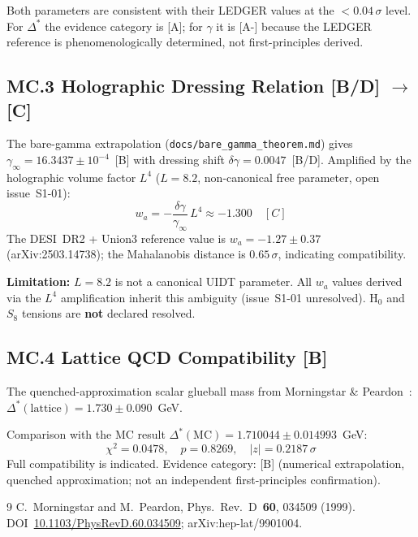 Both parameters are consistent with their LEDGER values at the $<0.04\,\sigma$
level.
For $\Delta^*$ the evidence category is [A];
for $\gamma$ it is [A-] because the LEDGER reference is phenomenologically
determined, not first-principles derived.

\subsection*{MC.3 Holographic Dressing Relation
  \textnormal{\textmd{[B/D] $\to$ [C]}}}

The bare-gamma extrapolation (\verb|docs/bare_gamma_theorem.md|) gives
$\gamma_\infty = 16.3437\pm10^{-4}$~[B] with dressing shift
$\delta\gamma = 0.0047$~[B/D].
Amplified by the holographic volume factor $L^4$ ($L=8.2$, non-canonical
free parameter, open issue~S1-01):
\[
  w_a = -\frac{\delta\gamma}{\gamma_\infty}\,L^4
        \approx -1.300 \quad [C]
\]
The DESI~DR2 + Union3 reference value is
$w_a = -1.27\pm0.37$ (arXiv:2503.14738);
the Mahalanobis distance is $0.65\,\sigma$, indicating compatibility.

\textbf{Limitation:} $L=8.2$ is not a canonical UIDT parameter.
All $w_a$ values derived via the $L^4$ amplification inherit this ambiguity
(issue~S1-01 unresolved).
H$_0$ and $S_8$ tensions are \textbf{not} declared resolved.

\subsection*{MC.4 Lattice QCD Compatibility \textnormal{\textmd{[B]}}}

The quenched-approximation scalar glueball mass from
Morningstar \& Peardon~\cite{Morningstar1999}:
$\Delta^*(\text{lattice}) = 1.730\pm0.090$~GeV.

Comparison with the MC result $\Delta^*(\text{MC}) = 1.710044\pm0.014993$~GeV:
\[
  \chi^2 = 0.0478, \quad p = 0.8269, \quad |z| = 0.2187\,\sigma
\]
Full compatibility is indicated.
Evidence category: [B] (numerical extrapolation, quenched approximation;
not an independent first-principles confirmation).

\begin{thebibliography}{9}
  C.~Morningstar and M.~Peardon,
  Phys.\ Rev.\ D~\textbf{60}, 034509 (1999).
  DOI~\href{https://doi.org/10.1103/PhysRevD.60.034509}{10.1103/PhysRevD.60.034509};
  arXiv:hep-lat/9901004.
\end{thebibliography}

